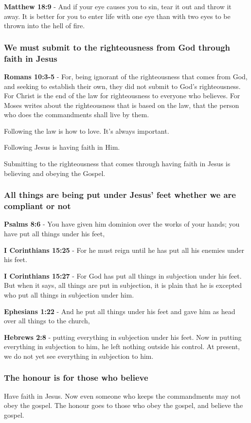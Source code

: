 \documentclass[11pt]{article}
\begin{document}
\textbf{Matthew 18:9} - And if your eye causes you to sin, tear it out and throw it away. It is better for you to enter life with one eye than with two eyes to be thrown into the hell of fire.

\subsubsection{We must submit to the righteousness from God through faith in Jesus}
\label{sec:org9481d5a}
\textbf{Romans 10:3-5} - For, being ignorant of the righteousness that comes from God, and seeking to establish their own, they did not submit to God's righteousness. For Christ is the end of the law for righteousness to everyone who believes. For Moses writes about the righteousness that is based on the law, that the person who does the commandments shall live by them.

Following the law is how to love. It's always important.

Following Jesus is having faith in Him.

Submitting to the righteousness that comes through having faith in Jesus is believing and obeying the Gospel.

\subsubsection{All things are being put under Jesus' feet whether we are compliant or not}
\label{sec:orgc5afc5b}

\textbf{Psalms 8:6} - You have given him dominion over the works of your hands; you have put all things under his feet,

\textbf{I Corinthians 15:25} - For he must reign until he has put all his enemies under his feet.

\textbf{I Corinthians 15:27} - For God has put all things in subjection under his feet. But when it says, all things are put in subjection, it is plain that he is excepted who put all things in subjection under him.

\textbf{Ephesians 1:22} - And he put all things under his feet and gave him as head over all things to the church,

\textbf{Hebrews 2:8} - putting everything in subjection under his feet. Now in putting everything in subjection to him, he left nothing outside his control. At present, we do not yet see everything in subjection to him.

\subsubsection{The honour is for those who believe}
\label{sec:org8c57b23}
Have faith in Jesus.
Now even someone who keeps the commandments may not obey the gospel.
The honour goes to those who obey the gospel, and believe the gospel.
\end{document}
